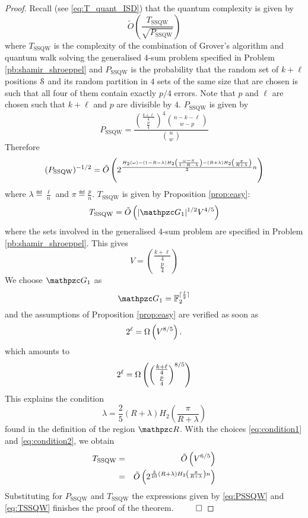 \begin{proof}
Recall (see \eqref{eq:T_quant_ISD}) that the quantum complexity is given by
\begin{equation}
\label{eq:complexitySSQW}
\tilde O\left(\frac{T_{\text{SSQW}}}{\sqrt{P_{\text{SSQW}}}}\right)
\end{equation}
where $T_{\text{SSQW}}$ is the complexity of the combination of Grover's algorithm and quantum walk
solving the generalised $4$-sum problem specified in Problem \ref{pb:shamir_shroeppel} and $P_{\text{SSQW}}$ is the probability
that the random set of $k + \ell$ positions $\mathcal{S}$ and its random partition in $4$ sets of the same size that are chosen is such that 
all four of them contain exactly $p/4$ errors.
Note that $p$ and $\ell$ are chosen such that $k+\ell$ and $p$ are divisible by $4$.
$P_{\text{SSQW}}$ is given by
$$
P_{\text{SSQW}} = \frac{  {\binom{\frac{k+\ell}{4}}{\frac{p}{4}}}^4 \binom{n-k-\ell}{w - p}}{\binom{n}{w}}
$$
Therefore
\begin{equation}
\label{eq:PSSQW}
(P_{\text{SSQW}})^{-1/2} = \tilde{O}\left( 2^{\frac{H_2(\omega) - (1-R-\lambda)H_2\left(\frac{\omega - \pi}{1 - R - \lambda}\right) - (R+\lambda)H_2\left(\frac{\pi}{R+\lambda}\right) }{2} n} \right)
\end{equation}
where $\lambda \eqdef \frac{\ell}{n}$ and $\pi \eqdef \frac{p}{n}$. $T_{\text{SSQW}}$ is given by Proposition \ref{prop:easy}:
$$
T_{\text{SSQW}}  =  \OOt{|\zG_1|^{1/2}V^{4/5}}
$$
where the sets involved in the generalised $4$-sum problem are specified in Problem \ref{pb:shamir_shroeppel}.
This gives
$$
V  =  \binom{\frac{k + \ell}{4}}{\frac{p}{4}}
$$
We choose $\zG_1$ as 
\begin{equation}\label{eq:condition1}
\zG_1 = \Ft^{\lceil \frac{\ell}{2} \rceil}
\end{equation}
and the assumptions of Proposition \ref{prop:easy} are verified as soon as
$$
2^\ell = \Omega \left( V^{8/5} \right).
$$
which amounts to
$$
2^\ell = \Omega \left(   {\binom{\frac{k + \ell}{4}}{\frac{p}{4}}}^{8/5} \right)
$$
This explains the condition 
\begin{equation}\label{eq:condition2}
\lambda = \frac{2}{5} (R + \lambda) H_2\left( \frac{\pi}{R+\lambda} \right)
\end{equation}
found in the definition of the region $\zR$.
With the choices \eqref{eq:condition1} and \eqref{eq:condition2}, 
we obtain
\begin{eqnarray}
T_{\text{SSQW}} &= &\tilde{O}\left( V^{6/5} \right) \nonumber \\
& = & \tilde{O}\left(  2^{\frac{3}{10}(R+\lambda)H_2\left( \frac{\pi}{R+\lambda} \right)n} \right)\label{eq:TSSQW}
\end{eqnarray}
Substituting for $P_{\text{SSQW}}$ and $T_{\text{SSQW}}$ the expressions given by \eqref{eq:PSSQW} and \eqref{eq:TSSQW} finishes the proof of the
theorem. $~\qed$
\end{proof}
